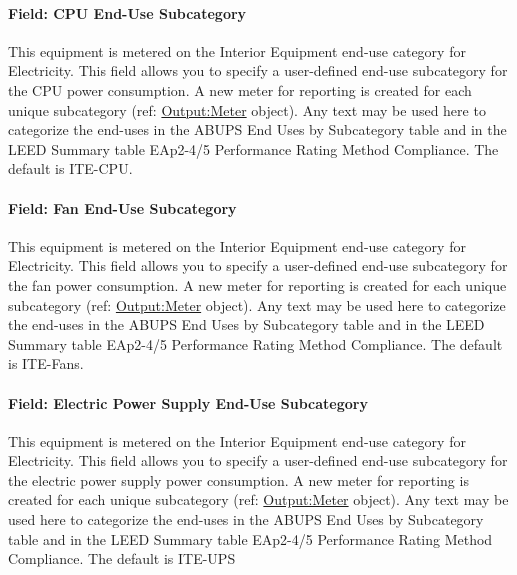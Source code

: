 \paragraph{Field: CPU End-Use Subcategory}\label{field-cpu-end-use-subcategory}

This equipment is metered on the Interior Equipment end-use category for Electricity. This field allows you to specify a user-defined end-use subcategory for the CPU power consumption. A new meter for reporting is created for each unique subcategory (ref: \hyperref[outputmeter-and-outputmetermeterfileonly]{Output:Meter} object). Any text may be used here to categorize the end-uses in the ABUPS End Uses by Subcategory table and in the LEED Summary table EAp2-4/5 Performance Rating Method Compliance. The default is ITE-CPU.

\paragraph{Field: Fan End-Use Subcategory}\label{field-fan-end-use-subcategory}

This equipment is metered on the Interior Equipment end-use category for Electricity. This field allows you to specify a user-defined end-use subcategory for the fan power consumption. A new meter for reporting is created for each unique subcategory (ref: \hyperref[outputmeter-and-outputmetermeterfileonly]{Output:Meter} object). Any text may be used here to categorize the end-uses in the ABUPS End Uses by Subcategory table and in the LEED Summary table EAp2-4/5 Performance Rating Method Compliance. The default is ITE-Fans.

\paragraph{Field: Electric Power Supply End-Use Subcategory}\label{field-electric-power-supply-end-use-subcategory}

This equipment is metered on the Interior Equipment end-use category for Electricity. This field allows you to specify a user-defined end-use subcategory for the electric power supply power consumption. A new meter for reporting is created for each unique subcategory (ref: \hyperref[outputmeter-and-outputmetermeterfileonly]{Output:Meter} object). Any text may be used here to categorize the end-uses in the ABUPS End Uses by Subcategory table and in the LEED Summary table EAp2-4/5 Performance Rating Method Compliance. The default is ITE-UPS

